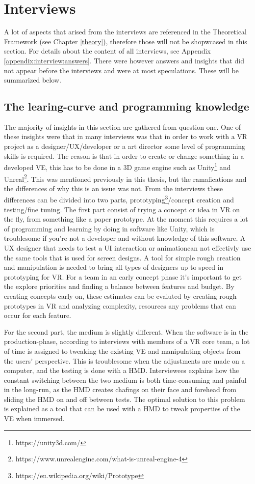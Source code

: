 \section{Interviews}
\label{result:interviews}
A lot of aspects that arised from the interviews are referenced in the Theoretical Framework (see Chapter \ref{theory}), therefore those will not be shopwcased in this section. For details about the content of all interviews, see Appendix \ref{appendix:interview:answers}. There were however answers and insights that did not appear before the interviews and were at most speculations. These will be summarized below.
\subsection{The learing-curve and programming knowledge}
\label{result:interviews:learningcurve}
The majority of insights in this section are gathered from question one. One of these insights were that in many interviews was that in order to work with a VR project as a designer/UX/developer or a art director some level of programming skills is required. The reason is that in order to create or change something in a developed VE, this has to be done in a 3D game engine such as Unity\footnote{https://unity3d.com/} and Unreal\footnote{https://www.unrealengine.com/what-is-unreal-engine-4}. This was mentioned previously in this thesis, but the ramafications and the differences of why this is an issue was not. From the interviews these differences can be divided into two parts, prototyping\footnote{https://en.wikipedia.org/wiki/Prototype}/concept creation and testing/fine tuning. The first part consist of trying a concept or idea in VR on the fly, from something like a paper prototype. At the moment this requires a lot of programming and learning by doing in software like Unity, which is troublesome if you're not a developer and without knowledge of this software. A UX designer that needs to test a UI interaction or animationcan not effectivly use the same tools that is used for  screen designs. A tool for simple rough creation and manipulation is needed to bring all types of designers up to speed in prototyping for VR. For a team in an early concept phase it's important to get the explore priorities and finding a balance between features and budget. By creating concepts early on, these estimates can be evaluted by creating rough prototypes in VR and analyzing complexity, resources any problems that can occur for each feature.

For the second part, the medium is slightly different. When the software is in the production-phase, according to interviews with members of a VR core team, a lot of time is assigned to tweaking the existing VE and manipulating objects from the users' perspective. This is troublesome when the adjustments are made on a computer, and the testing is done with a HMD. Interviewees explains how the constant switching between the two medium is both time-consuming and painful in the long-run, as the HMD creates chafings on their face and forehead from sliding the HMD on and off between tests. The optimal solution to this problem is explained as a tool that can be used with a HMD to tweak properties of the VE when immersed.
